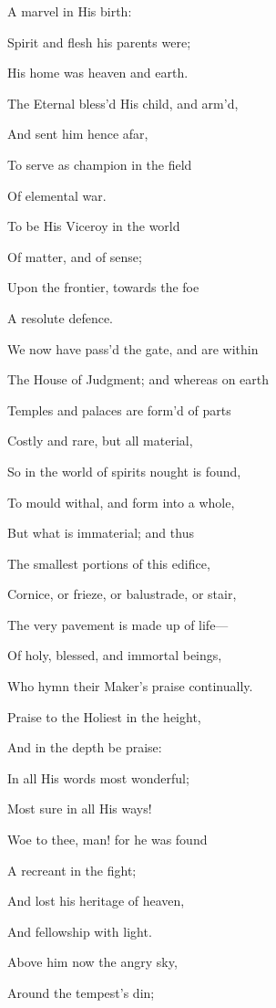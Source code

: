 A marvel in His birth:

Spirit
and flesh his parents were;

His home was heaven and earth.

The
Eternal bless'd His child, and arm'd,

And sent him hence afar,

To
serve as champion in the field

Of elemental war. 

To be His
Viceroy in the world

Of matter, and of sense;

Upon
the frontier, towards the foe

A resolute defence.


We now have pass'd the gate, and are within

The House of Judgment; and whereas on earth

Temples and palaces are form'd of parts

Costly and rare, but all material,

So in the world of spirits nought is found,

To mould withal, and form into a whole,

But what is immaterial; and thus

The smallest portions of this edifice,

Cornice, or frieze, or balustrade, or stair,

The very pavement is made up of life—

Of holy, blessed, and immortal beings,

Who hymn their Maker's praise continually.


Praise to
the Holiest in the height,

And in the depth be praise:

In all
His words most wonderful;

Most sure in all His ways! 

Woe to
thee, man! for he was found

A recreant in the fight;

And
lost his heritage of heaven,

And fellowship with light.

Above him
now the angry sky,

Around the tempest's din;

